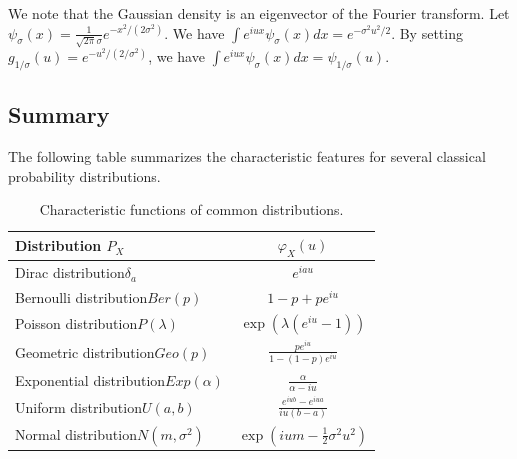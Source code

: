 We note that the Gaussian density is an eigenvector of the Fourier transform.
Let $\psi_\sigma(x) = \frac{1}{\sqrt{2\pi}\sigma} e^{-x^2/(2\sigma^2)}$. We have $\int e^{iux} \psi_\sigma(x) dx = e^{-\sigma^2 u^2/2}$. By setting $g_{1/\sigma}(u) = e^{-u^2/(2/\sigma^2)}$, we have $\int e^{iux} \psi_\sigma(x) dx = \psi_{1/\sigma}(u)$.\\%
\subsection{Summary}%
The following table summarizes the characteristic features for several classical probability distributions.%
\begin{table}[H]
\centering
\begin{tabular}{|l|c|}
\hline
\textbf{Distribution} $P_X$ & $\varphi_X(u)$ \\
\hline
Dirac distribution$\delta_a$ & $e^{iau}$ \\
Bernoulli distribution$Ber(p)$ & $1-p+pe^{iu}$ \\
Poisson distribution$P(\lambda)$ & $\exp(\lambda(e^{iu}-1))$ \\
Geometric distribution$Geo(p)$ & $\frac{pe^{iu}}{1-(1-p)e^{iu}}$ \\
Exponential distribution$Exp(\alpha)$ & $\frac{\alpha}{\alpha - iu}$ \\
Uniform distribution$U(a,b)$ & $\frac{e^{iub}-e^{iua}}{iu(b-a)}$ \\
Normal distribution$N(m, \sigma^2)$ & $\exp\left(ium - \frac{1}{2}\sigma^2 u^2\right)$ \\
\hline
\end{tabular}
\caption{Characteristic functions of common distributions.}
\end{table}%
